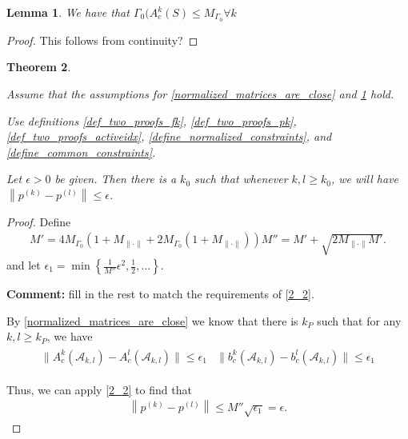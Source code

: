 \documentclass{article}
\newenvironment{comment}
  {\par\medskip
   \color{red}%
   \begin{framed}
   \textbf{Comment: }\ignorespaces}
 {\end{framed}
  \medskip}
\newtheorem{theorem}{Theorem}[section]
\newtheorem{lemma}[theorem]{Lemma}
\theoremstyle{case}
\newcommand{\maxnorm}{{M_{\|\cdot\|}}}
\newcommand{\huff}{{\Gamma_0}}
\begin{document}
\begin{lemma}
\label{hopefully_there_is_a_bound_for_this}
We have that $\huff(A^k_c(S) \le M_{\Gamma_0} \forall k$
\end{lemma}
\begin{proof}
\color{red}
This follows from continuity?
\color{black}
\end{proof}





\begin{theorem}
\label{bounded_projection_theorem}

Assume that the assumptions for
\cref{normalized_matrices_are_close}
and \cref{hopefully_there_is_a_bound_for_this}
hold.


Use definitions
\cref{def_two_proofs_fk},
\cref{def_two_proofs_pk},
\cref{def_two_proofs_activeidx},
\cref{define_normalized_constraints},
and \cref{define_common_constraints}.

Let $\epsilon > 0$ be given.
Then there is a $k_0$ such that whenever $k, l \ge k_0$,
we will have $\left\|p^{(k)} - p^{(l)} \right\| \le \epsilon$.
\end{theorem}
\begin{proof}
Define
\begin{align}
M' = 4M_{\Gamma_0}\left(1 + \maxnorm + 2M_{\Gamma_0}\left(1 + \maxnorm\right)\right)
M'' = M' + \sqrt{2\maxnorm M'}.
\end{align}
and let $\epsilon_1 = \min\left\{\frac 1 {M''} \epsilon^2, \frac 1 2 , \ldots  \right\}$. 
\begin{comment}
fill in the rest to match the requirements of \cref{2_2}.
\end{comment}

By \cref{normalized_matrices_are_close} we know that there is $k_P$ such that for any $k, l \ge k_P$, we have
\begin{align*}
\begin{array}{cc}
\|A_c^k\left(\mathcal A_{k, l}\right) - A_c^l\left(\mathcal A_{k, l}\right)\| \le \epsilon_1 & \|b_c^k\left(\mathcal A_{k, l}\right) - b_c^l\left(\mathcal A_{k, l}\right)\| \le \epsilon_1
\end{array}
\end{align*}


Thus, we can apply \cref{2_2} to find that
\begin{align*}
\left\|p^{(k)} - p^{(l)} \right\| \le M''\sqrt{\epsilon_1} = \epsilon.
\end{align*}

\end{proof}
\end{document}
